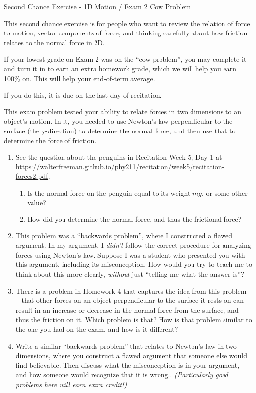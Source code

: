 \documentclass[12pt]{article}
\begin{document}
\begin{center}
\Large
\sc Second Chance Exercise - 1D Motion / Exam 2 Cow Problem \rm





\normalsize
This second chance exercise is for people who want to review the relation of force to motion, vector components of force, and thinking carefully about how friction relates to the normal force in 2D.

If your lowest grade on Exam 2 was on the ``cow problem'', you may complete it and turn it in to earn an extra homework grade, which we will help you earn 100\% on. This will help your end-of-term average.

If you do this, it is due on the last day of recitation.

\end{center}

\vspace{1.5in}

This exam problem tested your ability to relate forces in two dimensions to an object's motion. In it, you needed to use Newton's law perpendicular to the surface (the y-direction) to determine the normal force, and then use that to determine the force of friction.

\begin{enumerate}
		\item See the question about the penguins in Recitation Week 5, Day 1 at \url{https://walterfreeman.github.io/phy211/recitation/week5/recitation-forces2.pdf}. 
		\begin{enumerate}
			\item Is the normal force on the penguin equal to its weight $mg$, or some other value?
			\item How did you determine the normal force, and thus the frictional force?
		\end{enumerate}
	\item This problem was a ``backwards problem'', where I constructed a flawed argument. In my argument, I {\it didn't} follow the correct procedure for analyzing forces using Newton's law. Suppose I was a student who presented you with this argument, including its misconception. How would you try to teach me to think about this more clearly, {\it without} just ``telling me what the answer is''?

	\item There is a problem in Homework 4 that captures the idea from this problem -- that other forces on an object perpendicular to the surface it rests on can result in an increase or decrease in the normal force from the surface, and thus the friction on it. Which problem is that? How is that problem similar to the one you had on the exam, and how is it different?

    \item Write a similar ``backwards problem'' that relates to Newton's law in two dimensions, where you construct a flawed argument that someone else would find believable. Then discuss what the misconception is in your argument, and how someone would recognize that it is wrong.. {\it (Particularly good problems here will earn extra credit!)}
\end{enumerate}
\end{document}
